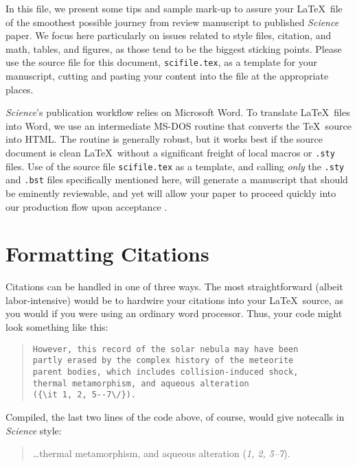 \documentclass[12pt]{article}
\begin{document}
In this file, we present some tips and sample mark-up to assure your
\LaTeX\ file of the smoothest possible journey from review manuscript
to published {\it Science\/} paper.  We focus here particularly on
issues related to style files, citation, and math, tables, and
figures, as those tend to be the biggest sticking points.  Please use
the source file for this document, \texttt{scifile.tex}, as a template
for your manuscript, cutting and pasting your content into the file at
the appropriate places.

{\it Science\/}'s publication workflow relies on Microsoft Word.  To
translate \LaTeX\ files into Word, we use an intermediate MS-DOS
routine \cite{tth} that converts the \TeX\ source into HTML\@.  The
routine is generally robust, but it works best if the source document
is clean \LaTeX\ without a significant freight of local macros or
\texttt{.sty} files.  Use of the source file \texttt{scifile.tex} as a
template, and calling {\it only\/} the \texttt{.sty} and \texttt{.bst}
files specifically mentioned here, will generate a manuscript that
should be eminently reviewable, and yet will allow your paper to
proceed quickly into our production flow upon acceptance \cite{use2e}.

\section*{Formatting Citations}

Citations can be handled in one of three ways.  The most
straightforward (albeit labor-intensive) would be to hardwire your
citations into your \LaTeX\ source, as you would if you were using an
ordinary word processor.  Thus, your code might look something like
this:


\begin{quote}
\begin{verbatim}
However, this record of the solar nebula may have been
partly erased by the complex history of the meteorite
parent bodies, which includes collision-induced shock,
thermal metamorphism, and aqueous alteration
({\it 1, 2, 5--7\/}).
\end{verbatim}
\end{quote}


\noindent Compiled, the last two lines of the code above, of course, would give notecalls in {\it Science\/} style:

\begin{quote}
\ldots thermal metamorphism, and aqueous alteration ({\it 1, 2, 5--7\/}).
\end{quote}
\end{document}
